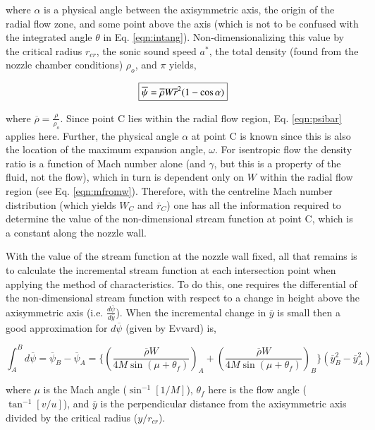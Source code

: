 	where $\alpha$ is a physical angle between the axisymmetric axis, the origin of the
radial flow zone, and some point above the axis (which is not to be confused with the integrated
angle $\theta$ in Eq. \ref{eqn:intang}).  Non-dimensionalizing this value by the critical
radius $r_{cr}$, the sonic sound speed $a^*$, the total density (found from the nozzle
chamber conditions) $\rho_o$, and $\pi$ yields,

\begin{equation}
	\fbox{$
	\overline{\psi} = \overline{\rho} W \overline{r}^2 (1-\cos\alpha)
	$}
\label{eqn:psibar}
\end{equation}	
	
	where $\overline{\rho} = \frac{\rho}{\rho_o}$.  Since point C lies within the
radial flow region, Eq. \ref{eqn:psibar} applies here.  Further, the physical angle $\alpha$ at point
C is known since this is also the location of the maximum expansion angle, $\omega$.  For isentropic flow 
the density ratio is a function of Mach number alone (and $\gamma$, but this is a property of 
the fluid, not the flow), which in turn is dependent only on $W$ within the radial flow region (see 
Eq. \ref{eqn:mfromw}).
Therefore, with the centreline Mach number distribution (which yields $W_C$ and $\overline{r}_C$)
one has all the information required to determine the value of the non-dimensional stream 
function at point C, which is a constant along the nozzle wall.  

	With the value of the stream function at the nozzle wall fixed, all that remains
is to calculate the incremental stream function at each intersection point when applying the 
method of characteristics.  To do this, one requires the differential of the non-dimensional stream 
function with respect to a change in height above the axisymmetric axis (i.e. $\frac{d\overline{\psi}}
{d\overline{y}}$).  When the incremental change in $\overline{y}$ is small then a good approximation for 
$d\overline{\psi}$ (given by Evvard) is,

\begin{equation}
	\int_{A}^{B}d\overline{\psi} = \overline{\psi}_B - \overline{\psi}_A = 
	\Big\{(\frac{\overline{\rho}W}{4M\sin(\mu + \theta_f)})_A + (\frac{\overline{\rho}W}
	{4M\sin(\mu + \theta_f)})_B \Big\}(\overline{y}^2_B - \overline{y}^2_A)
\label{eqn:dpsibar}
\end{equation}
	
	where $\mu$ is the Mach angle ($\sin^{-1}[1/M]$), $\theta_f$ here is the flow angle
($\tan^{-1}[v/u]$), and $\overline{y}$ is the perpendicular distance from the axisymmetric 
axis divided by the critical radius ($y/r_{cr}$).
 
